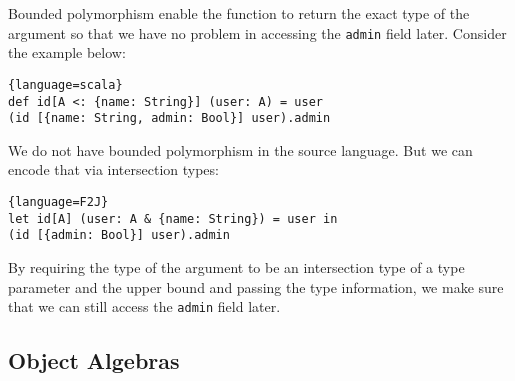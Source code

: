 Bounded polymorphism enable the function to return the exact type of the
argument so that we have no problem in accessing the \texttt{admin} field later.
Consider the example below:
\begin{lstlisting}{language=scala}
def id[A <: {name: String}] (user: A) = user
(id [{name: String, admin: Bool}] user).admin
\end{lstlisting}

We do not have bounded polymorphism in the source language. But we can encode
that via intersection types:
\begin{lstlisting}{language=F2J}
let id[A] (user: A & {name: String}) = user in
(id [{admin: Bool}] user).admin
\end{lstlisting}
By requiring the type of the argument to be an intersection type of a type
parameter and the upper bound and passing the type information, we make sure
that we can still access the \lstinline{admin} field later.






\subsection{Object Algebras}




